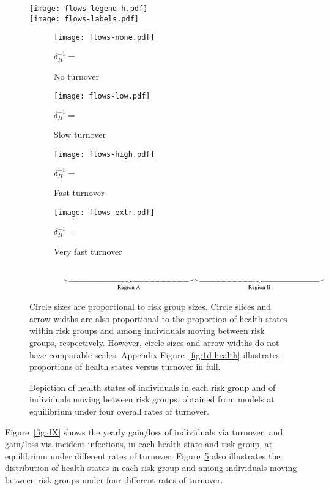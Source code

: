 \begin{figure}[!tbp]
  \begingroup\centering
  \texttt{[image: flows-legend-h.pdf]}\\
  \texttt{[image: flows-labels.pdf]}
  \begin{subfigure}[t]{0.22\linewidth}
    \texttt{[image: flows-none.pdf]}
    \caption{No turnover}
    \centering\footnotesize $\delta_H^{-1} = $
    \label{fig:flows-none}
  \end{subfigure}%
  \begin{subfigure}[t]{0.22\linewidth}
    \texttt{[image: flows-low.pdf]}
    \caption{Slow turnover}
    \centering\footnotesize $\delta_H^{-1} = $
    \label{fig:flows-low}
  \end{subfigure}%
  \begin{subfigure}[t]{0.22\linewidth}
    \texttt{[image: flows-high.pdf]}
    \caption{Fast turnover}
    \centering\footnotesize $\delta_H^{-1} = $
    \label{fig:flows-high}
  \end{subfigure}%
  \begin{subfigure}[t]{0.22\linewidth}
    \texttt{[image: flows-extr.pdf]}
    \caption{Very fast turnover}
    \centering\footnotesize $\delta_H^{-1} = $
    \label{fig:flows-extr}
  \end{subfigure}\\[0.5em]
  $\null\hspace{0.11\linewidth}
  \underbrace{\hspace{0.44\linewidth}}_{\textrm{Region~A}}
  \underbrace{\hspace{0.44\linewidth}}_{\textrm{Region~B}}$
  \endgroup
  \caption{Depiction of health states of individuals in each risk group
    and of individuals moving between risk groups,
    obtained from models at equilibrium
    under four overall rates of turnover.}
  \footnotesize
  Circle sizes are proportional to risk group sizes.
  Circle slices and arrow widths are also proportional to
  the proportion of health states within risk groups and
  among individuals moving between risk groups, respectively.
  However, circle sizes and arrow widths do not have comparable scales.
  Appendix Figure~\ref{fig:1d-health} illustrates
  proportions of health states versus turnover in full.
  \label{fig:flows}
\end{figure}
\par
Figure~\ref{fig:dX} shows the yearly
gain/loss of individuals via turnover, and
gain/loss via incident infections,
in each health state and risk group,
at equilibrium under different rates of turnover.
Figure~\ref{fig:flows} also illustrates
the distribution of health states in each risk group
and among individuals moving between risk groups
under four different rates of turnover.
